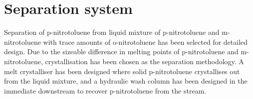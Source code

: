 \section*{Separation system}

Separation of p-nitrotoluene from liquid mixture of p-nitrotoluene and m-nitrotoluene with trace amounts of o-nitrotoluene has been selected for detailed design. Due to the sizeable difference in melting points of p-nitrotoluene and m-nitrotoluene, crystallisation has been chosen as the separation methodology. A melt crystalliser has been designed where solid p-nitrotoluene crystallises out from the liquid mixture, and a hydraulic wash column has been designed in the immediate downstream to recover p-nitrotoluene from the stream. 